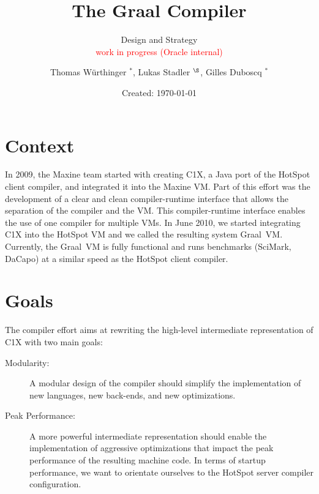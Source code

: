 \documentclass[twocolumn]{svjour3}
\newcommand{\Sa}{{\Large$^*$}}
\newcommand{\Sc}{{\Large$^\S$}}
\begin{document}
\author{Thomas W\"{u}rthinger \Sa, Lukas Stadler \Sc, Gilles Duboscq \Sa}
\institute{\Sa Oracle, \Sc Johannes Kepler University, Linz}

\date{Created: \today}

\title{The Graal Compiler}
\subtitle{Design and Strategy \\ \textcolor{red}{work in progress (Oracle internal)}}

\maketitle


\section{Context}

In 2009, the Maxine team started with creating C1X, a Java port of the HotSpot client compiler, and integrated it into the Maxine VM.
Part of this effort was the development of a clear and clean compiler-runtime interface that allows the separation of the compiler and the VM.
This compiler-runtime interface enables the use of one compiler for multiple VMs.
In June 2010, we started integrating C1X into the HotSpot VM and we called the resulting system Graal~VM.
Currently, the Graal~VM is fully functional and runs benchmarks (SciMark, DaCapo) at a similar speed as the HotSpot client compiler.

\section{Goals}
The compiler effort aims at rewriting the high-level intermediate representation of C1X with two main goals:
\begin{description}
\item[Modularity:]
A modular design of the compiler should simplify the implementation of new languages, new back-ends, and new optimizations.
\item[Peak Performance:]
A more powerful intermediate representation should enable the implementation of aggressive optimizations that impact the peak performance of the resulting machine code.
In terms of startup performance, we want to orientate ourselves to the HotSpot server compiler configuration.
\end{description}
\end{document}
